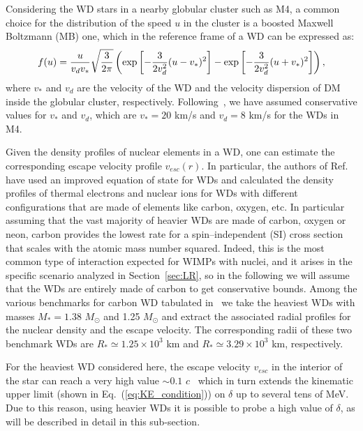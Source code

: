 \documentclass[11pt]{article}
\begin{document}
Considering the WD stars in a nearby globular cluster such as M4, a common choice for the distribution of the speed $u$ in the cluster is a boosted Maxwell Boltzmann (MB) one, which in the 
reference frame of a WD can be expressed as:
\begin{equation}
f(u) = \frac{u}{v_d v_*} \sqrt{\frac{3}{2 \pi}} \left({\rm exp} \left[-\frac{3}{2 v^2_d}(u-v_*)^2\right] - 
{\rm exp} \left[-\frac{3}{2 v^2_d}(u+v_*)^2\right]\right) ,
\label{eq:MB_velocity}
\end{equation}
where $v_*$ and $v_d$ are the velocity of the WD and the velocity dispersion of DM 
inside the globular cluster, respectively. 
Following~\cite{idm_wd_2010, improved_WD_2021}, we have assumed conservative values for $v_*$ and $v_d$, which are $v_* = 20$ km/s and $v_d = 8$ km/s for the WDs in M4.

Given the density profiles of nuclear elements in a WD, one can estimate the corresponding escape velocity profile $v_{esc}(r)$. In particular, the authors of Ref.~\cite{improved_WD_2021} have used an improved equation of state for WDs and calculated the density profiles of thermal electrons and nuclear ions for WDs with different configurations that are made of elements like carbon, oxygen, etc. In particular assuming that the vast majority of heavier WDs are made of carbon, oxygen or neon, carbon provides the lowest rate for a spin--independent (SI) cross section that scales with the atomic mass number squared. Indeed, this is the most common type of interaction expected for WIMPs with nuclei, and it arises in the specific scenario analyzed in Section~\ref{sec:LR}, so in the following we will assume that the WDs are entirely made of carbon to get conservative bounds. 
Among the various benchmarks for carbon WD tabulated in~\cite{improved_WD_2021} we take the heaviest WDs 
with masses $M_* = 1.38$ \(M_\odot\) and 1.25 \(M_\odot\) and extract the associated radial profiles for the nuclear density and the escape velocity. The corresponding radii of these two benchmark WDs are $R_* \simeq 1.25 \times 10^3$ km and 
$R_* \simeq 3.29 \times 10^3$ km, respectively. 


For the heaviest WD considered here, the escape velocity $v_{esc}$ in the interior of the star 
can reach a very high value $\sim 0.1$ $c$~\cite{improved_WD_2021} which in turn extends the kinematic upper limit (shown in Eq.~(\ref{eq:KE_condition})) on $\delta$ up to several tens of MeV. Due to this reason, using heavier WDs it is possible to probe a high value of $\delta$, as will be described 
in detail in this sub-section.
\end{document}
